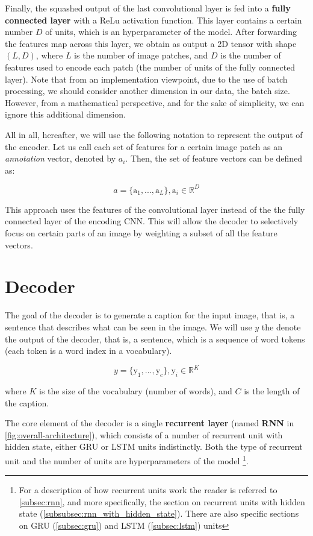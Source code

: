 Finally, the squashed output of the last convolutional layer is fed into a \textbf{fully connected layer} with a ReLu activation function. This layer contains a certain number $D$ of units, which is an hyperparameter of the model. After forwarding the features map across this layer, we obtain as output a 2D tensor with shape $(L, D)$, where $L$ is the number of image patches, and $D$ is the number of features used to encode each patch (the number of units of the fully connected layer). Note that from an implementation viewpoint, due to the use of batch processing, we should consider another dimension in our data, the batch size. However, from a mathematical perspective, and for the sake of simplicity, we can ignore this additional dimension. 

All in all, hereafter, we will use the following notation to represent the output of the encoder. 
Let us call each set of features for a certain image patch as an \textit{annotation} vector, denoted by $a_i$. Then, the set of feature vectors can be defined as:

$$a = \{\text{a}_1,...,\text{a}_L \}, \text{a}_i \in \mathbb{R}^D$$

This approach uses the features of the convolutional layer instead of the the fully connected layer of the encoding CNN. This will allow the decoder to selectively focus on certain parts of an image by weighting a subset of all the feature vectors.

\section{Decoder}

The goal of the decoder is to generate a caption for the input image, that is, a  sentence that describes what can be seen in the image. We will use $y$ the denote the output of the decoder, that is, a sentence, which is a sequence of word tokens (each token is a word index in a vocabulary).

$$y = \{\text{y}_1,..., \text{y}_c\}, \text{y}_i \in \mathbb{R}^K$$

where $K$ is the size of the vocabulary (number of words), and $C$ is the length of the caption.

The core element of the decoder is a single \textbf{recurrent layer} (named \textbf{RNN} in \cref{fig:overall-architecture}), which consists of a number of recurrent unit with hidden state, either GRU or LSTM units indistinctly. Both the type of recurrent unit and the number of units are hyperparameters of the model \footnote{For a description of how recurrent units work the reader is referred to \cref{subsec:rnn}, and more specifically, the section on recurrent units with hidden state (\cref{subsubsec:rnn_with_hidden_state}). There are also specific sections on GRU (\cref{subsec:gru}) and LSTM (\cref{subsec:lstm}) units}.

